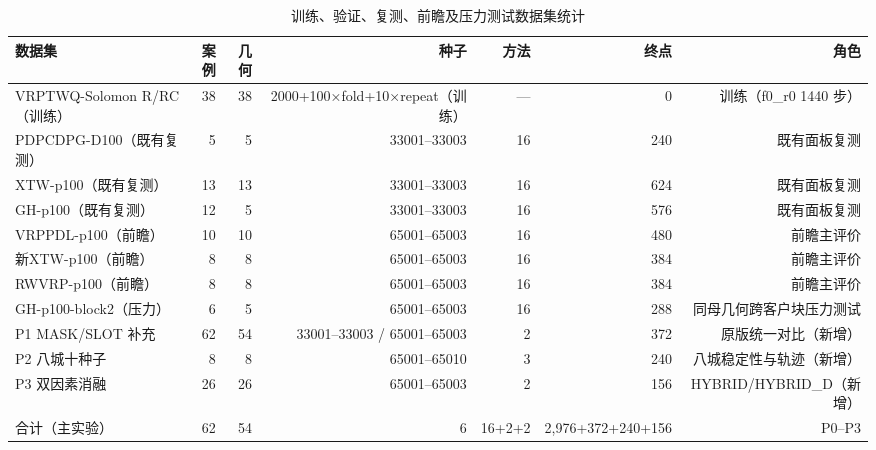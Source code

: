 \begin{table}[t]
\centering
\caption{训练、验证、复测、前瞻及压力测试数据集统计}
\label{tab:tab_datasets}
\begin{tabular}{lrrrrrr}
\toprule
数据集 & 案例 & 几何 & 种子 & 方法 & 终点 & 角色 \\
\midrule
VRPTWQ-Solomon R/RC（训练） & 38 & 38 & 2000+100×fold+10×repeat（训练） & — & 0 & 训练（f0_r0 1440 步） \\
PDPCDPG-D100（既有复测） & 5 & 5 & 33001–33003 & 16 & 240 & 既有面板复测 \\
XTW-p100（既有复测） & 13 & 13 & 33001–33003 & 16 & 624 & 既有面板复测 \\
GH-p100（既有复测） & 12 & 5 & 33001–33003 & 16 & 576 & 既有面板复测 \\
VRPPDL-p100（前瞻） & 10 & 10 & 65001–65003 & 16 & 480 & 前瞻主评价 \\
新XTW-p100（前瞻） & 8 & 8 & 65001–65003 & 16 & 384 & 前瞻主评价 \\
RWVRP-p100（前瞻） & 8 & 8 & 65001–65003 & 16 & 384 & 前瞻主评价 \\
GH-p100-block2（压力） & 6 & 5 & 65001–65003 & 16 & 288 & 同母几何跨客户块压力测试 \\
P1 MASK/SLOT 补充 & 62 & 54 & 33001–33003 / 65001–65003 & 2 & 372 & 原版统一对比（新增） \\
P2 八城十种子 & 8 & 8 & 65001–65010 & 3 & 240 & 八城稳定性与轨迹（新增） \\
P3 双因素消融 & 26 & 26 & 65001–65003 & 2 & 156 & HYBRID/HYBRID_D（新增） \\
合计（主实验） & 62 & 54 & 6 & 16+2+2 & 2,976+372+240+156 & P0–P3 \\
\bottomrule
\end{tabular}
\end{table}
